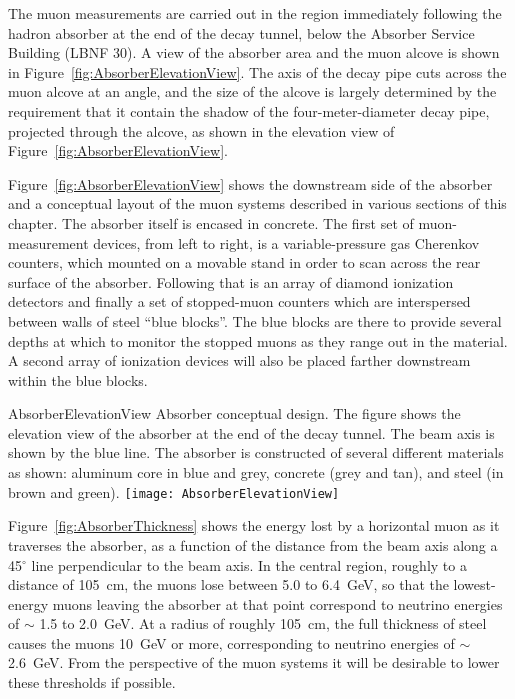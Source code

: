 The muon measurements are carried out in the region immediately
following the hadron absorber at the end of the decay tunnel, below
the Absorber Service Building (LBNF 30).  A view
of the absorber area and the muon alcove is shown in Figure~\ref{fig:AbsorberElevationView}. 
The axis of the decay pipe cuts across the muon alcove at an angle, and the size of the alcove
is largely determined by the requirement that it contain the
shadow of the four-meter-diameter decay pipe, projected through the
alcove, as shown in the elevation view of Figure~\ref{fig:AbsorberElevationView}. 

Figure~\ref{fig:AbsorberElevationView} shows the downstream side of the
absorber and a conceptual layout of the muon systems described in various sections of this
chapter.  
The absorber itself is encased in concrete. The first set of
muon-measurement devices, from left to right, is a
 variable-pressure gas Cherenkov counters, which 
mounted on a movable stand in order to scan across the rear surface of the absorber.
 Following that is an
array of diamond ionization detectors and finally a set of stopped-muon 
counters which are interspersed between walls of
steel ``blue blocks''.   The blue blocks are there to provide several
depths at which to monitor the stopped muons as they range out in the
material. A second array of ionization devices will also be placed farther downstream within the blue blocks.

\begin{cdrfigure}{AbsorberElevationView}
{Absorber conceptual design. The figure shows the elevation view of the 
absorber at the end of the decay tunnel. The beam axis is shown by
the blue line. The absorber is constructed of several different 
materials as shown: aluminum core in blue and grey, concrete 
(grey and tan), and steel (in brown and green).}
\texttt{[image: AbsorberElevationView]}
\end{cdrfigure}

Figure~\ref{fig:AbsorberThickness} shows the energy lost by a
horizontal muon as it traverses the absorber, as a function of the
distance from the beam axis along a 45$^\circ$ line perpendicular to the beam axis. 
In the central region, roughly to a distance of  105~cm, the muons lose between 5.0 to 6.4~GeV, so that the
lowest-energy muons leaving the absorber at that point correspond to
neutrino energies of $\sim$ 1.5 to 2.0~GeV. At a radius of roughly 105~cm, the
full thickness of steel causes the muons 10~GeV or more,
corresponding to neutrino energies of $\sim$ 2.6~GeV. From the
perspective of the muon systems it will be desirable to lower these
thresholds if possible. 

